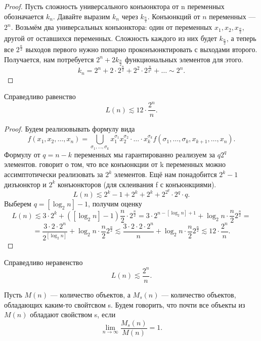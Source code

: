\begin{proof}
Пусть сложность универсального конъюнктора от n переменных обозначается $k_n$.
Давайте выразим $k_n$ через $k_{\frac{n}{2}}$. Конъюнкций от $n$ переменных --- $2^n$.
Возьмём два универсальных конъюнктора: один от переменных $x_1,x_2,
x_{\frac{n}{2}}$, другой от оставшихся переменных. Сложность каждого из них
будет $k_{\frac{n}{2}}$, а теперь все $2^{\frac{n}{2}}$ выходов первого нужно
попарно проконъюнктировать с выходами второго. Получается, нам потребуется $2^n
+ 2k_{\frac{n}{2}}$ функциональных элементов для этого. \[
	k_n = 2^n + 2\cdot 2^{\frac{n}{2}} + 2^2\cdot 2^{\frac{n}{2^2}} + \ldots
\sim 2^n .\]
\end{proof}
\begin{theorem}
	Справедливо равенство \[
		L(n) \lesssim 12 \cdot \frac{2^n}{n}
	.\] 
\end{theorem}
\begin{proof}
Будем реализовывать формулу вида \[
	f(x_1, x_2,\ldots,x_n) = \bigcup\limits_{\sigma_1,\ldots,
	\sigma_k}x_1^{\sigma_1}x_2^{\sigma_2}\cdot\ldots\cdot x_k^{\sigma_k}
	f(\sigma_1, \ldots, \sigma_k, x_{k+1}, \ldots, x_n)
.\] 
Формулу от $q = n - k$ переменных мы гарантированно реализуем за  $q2^q$
элементов.
 говорит о том, что все конъюнкции от k переменных
можно ассимптотически реализовать за $2^k$ элементов. Ещё нам понадобится
$2^k-1$ дизъюнктор и $2^k$ конъюнкторов (для склеивания f с конъюнкциями).
 \[
	 L(n) \lesssim 2^k - 1 + 2^k + 2^k+ 2^{2^q}\cdot 2^q\cdot q
.\] 
Выберем $q = \left[\log_2 n\right] - 1$, получим оценку \[
L(n) \lesssim 3\cdot 2^k + (\left[\log_2 n\right] - 1 ) \frac{n}{2} \cdot
2^{\frac{n}{2}} = 3\cdot 2^{n-\left[\log_2n\right] +1} + \log_2n \cdot \frac{n}{2}
2^{\frac{n}{2}} = \] 
\[
	= \frac{ 3\cdot 2\cdot 2^n }{2^{\left[ \log_2n \right] }} +  \log_2n \cdot \frac{n}{2}
	2^{\frac{n}{2}} \lesssim \frac{3\cdot 2\cdot 2\cdot 2^n}{n} +  \log_2n \cdot \frac{n}{2}
	2^{\frac{n}{2}} \lesssim 12\cdot \frac{2^n}{n}
.\] 
\end{proof}

\begin{theorem}[О. Б. Лупанов]
	Справедливо неравенство \[L(n) \lesssim \frac{2^n}{n}.\]
\end{theorem}

\begin{definition}
	Пусть $M(n)$ --- количество объектов, а $M_s(n)$ --- количество
	объектов, обладающих каким-то свойтсвом s. Будем говорить, что почти все
	объекты из $M(n)$ обладают свойством s, если \[
		\lim_{n \to \infty} \frac{M_s(n)}{M(n)} = 1
	.\] 
\end{definition}

